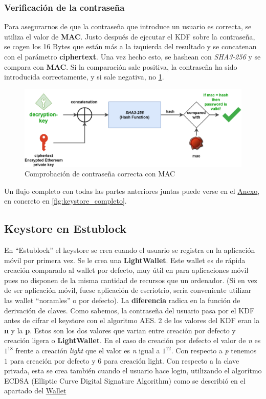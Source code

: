 \subsubsection{Verificación de la contraseña}

Para asegurarnos de que la contraseña que introduce un usuario es correcta, se utiliza el valor de \textbf{MAC}. Justo después de ejecutar el KDF sobre la contraseña, se cogen los 16 Bytes que están más a la izquierda del resultado y se concatenan con el parámetro \textbf{ciphertext}. Una vez hecho esto, se hashean con \emph{SHA3-256} y se compara con \textbf{MAC}. Si la comparación sale positiva, la contraseña ha sido introducida correctamente, y si sale negativa, no \ref{fig:keystore_MAC}.

\begin{figure}[h!]
  \centering
  \includegraphics[width=0.8\linewidth]{figs/Desarrollo/Keystore/keystore_MAC}
  \caption[Comprobación de contraseña correcta con MAC]{Comprobación de contraseña correcta con MAC}
  \label{fig:keystore_MAC}
\end{figure}

Un flujo completo con todas las partes anteriores juntas puede verse en el \hyperref[cap:Anexo]{Anexo}, en concreto en \ref{fig:keystore_completo}.

\subsection{Keystore en Estublock}

En ``Estublock'' el keystore se crea cuando el usuario se registra en la aplicación móvil por primera vez. Se le crea una \textbf{LightWallet}. Este wallet es de rápida creación comparado al wallet por defecto, muy útil en para aplicaciones móvil pues no disponen de la misma cantidad de recursos que un ordenador. (Si en vez de ser aplicación móvil, fuese aplicación de escriotrio, sería conveniente utilizar las wallet ``noramles'' o por defecto). La \textbf{diferencia} radica en la función de derivación de claves. Como sabemos, la contraseña del usuario pasa por el KDF antes de cifrar el keystore con el algoritmo AES. 2 de los valores del KDF eran la \textbf{n} y la \textbf{p}. Estos son los dos valores que varian entre creación por defecto y creación ligera o \textbf{LightWallet}. En el caso de creación por defecto el valor de \emph{n} es $1^18$ frente a creación \emph{light} que el valor es \emph{n} igual a $1^12$. Con respecto a \emph{p} tenemos $1$ para creación por defecto y 6 para creación light. Con respecto a la clave privada, esta se crea también cuando el usuario hace login, utilizando el algorítmo ECDSA (Elliptic Curve Digital Signature Algorithm) como se describió en el apartado del \hyperref[sec:wallet]{Wallet} \\

